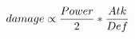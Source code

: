 \documentclass[preview]{standalone}
\begin{document}
\begin{align*}
\special{dvisvgm:raw <g id='unique000'>}damage \propto \frac{Power}{2} * \frac{Atk}{Def}\special{dvisvgm:raw </g>}
\end{align*}
\end{document}
